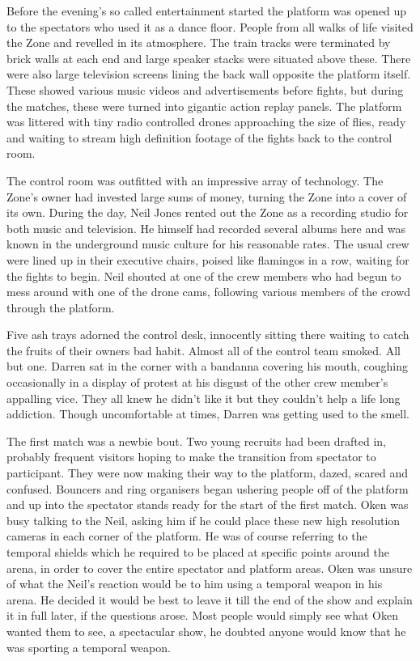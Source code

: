 Before the evening's so called entertainment started the platform was opened up to the spectators who used it as a dance floor. People from all walks of life visited the Zone and revelled in its atmosphere. The train tracks were terminated by brick walls at each end and large speaker stacks were situated above these. There were also large television screens lining the back wall opposite the platform itself. These showed various music videos and advertisements before fights, but during the matches, these were turned into gigantic action replay panels. The platform was littered with tiny radio controlled drones approaching the size of flies, ready and waiting to stream high definition footage of the fights back to the control room.

The control room was outfitted with an impressive array of technology. The Zone's owner had invested large sums of money, turning the Zone into a cover of its own. During the day, Neil Jones rented out the Zone as a recording studio for both music and television. He himself had recorded several albums here and was known in the underground music culture for his reasonable rates. The usual crew were lined up in their executive chairs, poised like flamingos in a row, waiting for the fights to begin. Neil shouted at one of the crew members who had begun to mess around with one of the drone cams, following various members of the crowd through the platform.

Five ash trays adorned the control desk, innocently sitting there waiting to catch the fruits of their owners bad habit. Almost all of the control team smoked. All but one. Darren sat in the corner with a bandanna covering his mouth, coughing occasionally in a display of protest at his disgust of the other crew member's appalling vice. They all knew he didn't like it but they couldn't help a life long addiction. Though uncomfortable at times, Darren was getting used to the smell.

The first match was a newbie bout. Two young recruits had been drafted in, probably frequent visitors hoping to make the transition from spectator to participant. They were now making their way to the platform, dazed, scared and confused. Bouncers and ring organisers began ushering people off of the platform and up into the spectator stands ready for the start of the first match. Oken was busy talking to the Neil, asking him if he could place these new high resolution cameras in each corner of the platform. He was of course referring to the temporal shields which he required to be placed at specific points around the arena, in order to cover the entire spectator and platform areas. Oken was unsure of what the Neil's reaction would be to him using a temporal weapon in his arena. He decided it would be best to leave it till the end of the show and explain it in full later, if the questions arose. Most people would simply see what Oken wanted them to see, a spectacular show, he doubted anyone would know that he was sporting a temporal weapon.

